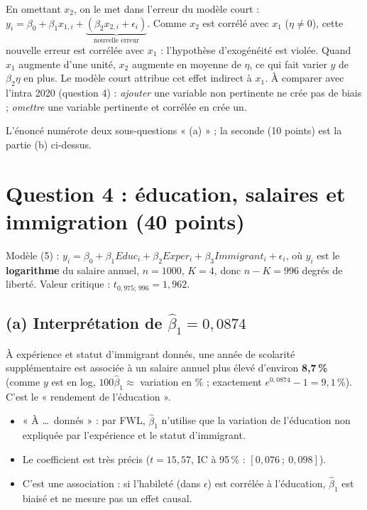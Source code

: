 \documentclass[11pt,a4paper]{article}
\begin{document}
\begin{intuition}
En omettant $x_2$, on le met dans l'erreur du modèle court : $y_i=\beta_0+\beta_1x_{1,i}+\underbrace{(\beta_2x_{2,i}+\epsilon_i)}_{\text{nouvelle erreur}}$. Comme $x_2$ est corrélé avec $x_1$ ($\eta\neq0$), cette nouvelle erreur est corrélée avec $x_1$ : l'hypothèse d'exogénéité est violée. Quand $x_1$ augmente d'une unité, $x_2$ augmente en moyenne de $\eta$, ce qui fait varier $y$ de $\beta_2\eta$ en plus. Le modèle court attribue cet effet indirect à $x_1$. À comparer avec l'intra 2020 (question 4) : \emph{ajouter} une variable non pertinente ne crée pas de biais ; \emph{omettre} une variable pertinente et corrélée en crée un.
\end{intuition}

\begin{attention}
L'énoncé numérote deux sous-questions « (a) » ; la seconde (10 points) est la partie (b) ci-dessus.
\end{attention}

\section{Question 4 : éducation, salaires et immigration (40 points)}

Modèle (5) : $y_i=\beta_0+\beta_1Educ_i+\beta_2Exper_i+\beta_3Immigrant_i+\epsilon_i$, où $y_i$ est le \textbf{logarithme} du salaire annuel, $n=1000$, $K=4$, donc $n-K=996$ degrés de liberté. Valeur critique : $t_{0{,}975;\,996}=1{,}962$.

\subsection*{(a) Interprétation de $\hat\beta_1=0{,}0874$}

\begin{reponse}
À expérience et statut d'immigrant donnés, une année de scolarité supplémentaire est associée à un salaire annuel plus élevé d'environ \textbf{8,7\,\%} (comme $y$ est en log, $100\hat\beta_1\approx$ variation en \% ; exactement $e^{0{,}0874}-1=9{,}1\,\%$). C'est le « rendement de l'éducation ».
\begin{itemize}[nosep]
\item « À \dots\ donnés » : par FWL, $\hat\beta_1$ n'utilise que la variation de l'éducation non expliquée par l'expérience et le statut d'immigrant.
\item Le coefficient est très précis ($t=15{,}57$, IC à 95\,\% : $[0{,}076\ ;\ 0{,}098]$).
\item C'est une association : si l'habileté (dans $\epsilon$) est corrélée à l'éducation, $\hat\beta_1$ est biaisé et ne mesure pas un effet causal.
\end{itemize}
\end{reponse}
\end{document}
